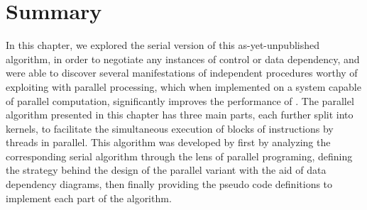 \section{Summary}
In this chapter, we explored the serial version of this as-yet-unpublished algorithm, in order to negotiate any instances of control or data dependency, and were able to discover several manifestations of independent procedures worthy of exploiting with parallel processing, which when implemented on a system capable of parallel computation, significantly improves the performance of . The parallel algorithm presented in this chapter has three main parts, each further split into kernels, to facilitate the simultaneous execution of blocks of instructions by threads in parallel. This algorithm was developed by first by analyzing the corresponding serial algorithm through the lens of parallel programing, defining the strategy behind the design of the parallel variant with the aid of data dependency diagrams, then finally providing the pseudo code definitions to implement each part of the algorithm.

